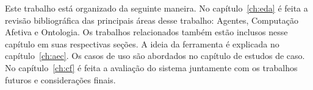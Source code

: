 Este trabalho está organizado da seguinte maneira. No capítulo~\ref{ch:eda}
é feita a revisão bibliográfica das principais áreas desse trabalho:
Agentes, Computação Afetiva e Ontologia. Os trabalhos relacionados também
estão inclusos nesse capítulo em suas respectivas seções. A ideia da
ferramenta é explicada no capítulo~\ref{ch:aec}. Os casos de uso são abordados no
capítulo de estudos de caso. No capítulo~\ref{ch:cf} é feita a avaliação do sistema
juntamente com os trabalhos futuros e considerações finais.
